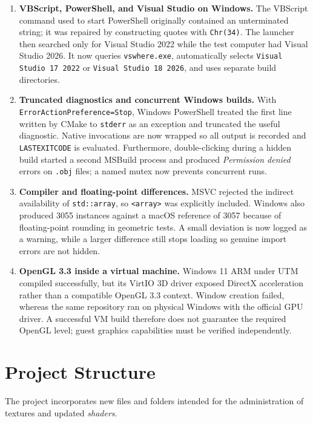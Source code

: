 \documentclass[letter,11pt]{article}
\begin{document}
\begin{enumerate}[leftmargin=*]
		\item \textbf{VBScript, PowerShell, and Visual Studio on Windows.}
		The VBScript command used to start PowerShell originally contained an unterminated string; it was repaired by constructing quotes with \texttt{Chr(34)}. The launcher then searched only for Visual Studio 2022 while the test computer had Visual Studio 2026. It now queries \texttt{vswhere.exe}, automatically selects \texttt{Visual Studio 17 2022} or \texttt{Visual Studio 18 2026}, and uses separate build directories.

		\item \textbf{Truncated diagnostics and concurrent Windows builds.}
		With \texttt{ErrorActionPreference=Stop}, Windows PowerShell treated the first line written by CMake to \texttt{stderr} as an exception and truncated the useful diagnostic. Native invocations are now wrapped so all output is recorded and \texttt{LASTEXITCODE} is evaluated. Furthermore, double-clicking during a hidden build started a second MSBuild process and produced \textit{Permission denied} errors on \texttt{.obj} files; a named mutex now prevents concurrent runs.

		\item \textbf{Compiler and floating-point differences.}
		MSVC rejected the indirect availability of \texttt{std::array}, so \texttt{<array>} was explicitly included. Windows also produced 3055 instances against a macOS reference of 3057 because of floating-point rounding in geometric tests. A small deviation is now logged as a warning, while a larger difference still stops loading so genuine import errors are not hidden.

		\item \textbf{OpenGL 3.3 inside a virtual machine.}
		Windows 11 ARM under UTM compiled successfully, but its VirtIO 3D driver exposed DirectX acceleration rather than a compatible OpenGL 3.3 context. Window creation failed, whereas the same repository ran on physical Windows with the official GPU driver. A successful VM build therefore does not guarantee the required OpenGL level; guest graphics capabilities must be verified independently.
	\end{enumerate}
	
	\section{Project Structure}
	The project incorporates new files and folders intended for the administration of textures and updated \textit{shaders}.
	
\end{document}
